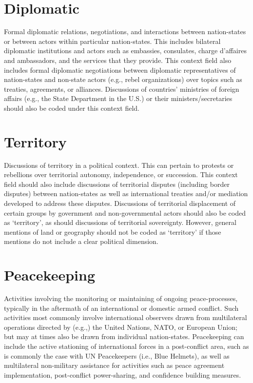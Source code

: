 \documentclass[11pt]{report}
\begin{document}
\section{Diplomatic}\label{context:diplomatic}

Formal diplomatic relations, negotiations, and interactions between nation-states or between actors within particular nation-states. This includes bilateral diplomatic institutions and actors such as embassies, consulates, charge d'affaires and ambassadors, and the services that they provide. This context field also includes formal diplomatic negotiations between diplomatic representatives of nation-states and non-state actors (e.g., rebel organizations) over topics such as treaties, agreements, or alliances. Discussions of countries' ministries of foreign affairs (e.g., the State Department in the U.S.) or their ministers/secretaries should also be coded under this context field.


\section{Territory}\label{context:territory}

Discussions of territory in a political context. This can pertain to protests or rebellions over territorial autonomy, independence, or succession. This context field should also include discussions of territorial disputes (including border disputes) between nation-states as well as international treaties and/or mediation developed to address these disputes. Discussions of territorial displacement of certain groups by government and non-governmental actors should also be coded as `territory', as should discussions of territorial sovereignty. However, general mentions of land or geography should not be coded as `territory' if those mentions do not include a clear political dimension.

\section{Peacekeeping}\label{context:peacekeeping}

Activities involving the monitoring or maintaining of ongoing peace-processes, typically in the aftermath of an international or domestic armed conflict. Such activities most commonly involve international observers drawn from multilateral operations directed by (e.g.,) the United Nations, NATO, or European Union; but may at times also be drawn from individual nation-states. Peacekeeping can include the active stationing of international forces in a post-conflict area, such as is commonly the case with UN Peacekeepers (i.e., Blue Helmets), as well as multilateral non-military assistance for activities such as peace agreement implementation, post-conflict power-sharing, and confidence building measures.
\end{document}
